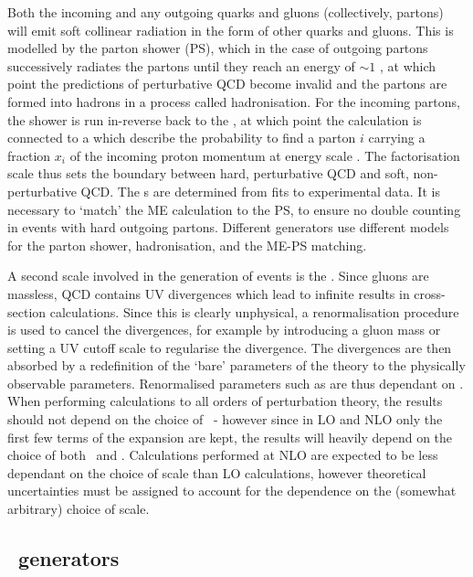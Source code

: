 Both the incoming and any outgoing quarks and gluons
(collectively, partons) will emit soft collinear radiation in the form of other quarks and gluons. This is
modelled by the parton shower (PS), which in the case of outgoing partons
successively radiates the partons until they reach an energy of $\sim 1$ \gev, at
which point the predictions of perturbative QCD become invalid and the partons
are formed into hadrons in a process called hadronisation. For the incoming partons, the
shower is run in-reverse back to the , at which
point the calculation is connected to a  which describe the probability to find a parton $i$ carrying a
fraction $x_i$ of the incoming proton momentum at energy scale \uF. The
factorisation scale thus sets the boundary between hard, perturbative QCD and
soft, non-perturbative QCD. The \partDF s are determined from fits to
experimental data. It is necessary to `match' the
ME calculation to the PS, to ensure no double counting in events with hard
outgoing partons. Different generators use different models for the parton
shower, hadronisation, and the ME-PS matching.

A second scale involved in the generation of events is the
. Since gluons are massless, QCD contains UV
divergences which lead to infinite results in cross-section calculations. Since 
this is clearly unphysical, a renormalisation procedure is used to cancel the
divergences, for example by introducing a gluon mass or setting a UV cutoff
scale to regularise the divergence. The divergences are then absorbed by a
redefinition of the `bare' parameters of the theory to the physically observable
parameters. Renormalised parameters such as \alphaS are thus dependant on \uR.
When performing calculations to all orders of perturbation theory,  the results
should not depend on the choice of \uR\ - however since in LO and NLO only the
first few terms of the expansion are kept, the results will heavily depend on
the choice of both \uR\ and \uF. Calculations performed at NLO are expected to
be less dependant on the choice of scale than LO calculations, however
theoretical uncertainties must be assigned to account for the dependence on the
(somewhat arbitrary) choice of scale.

\subsection{\mc\ generators}
\label{sec:Theory-MC-gen}

